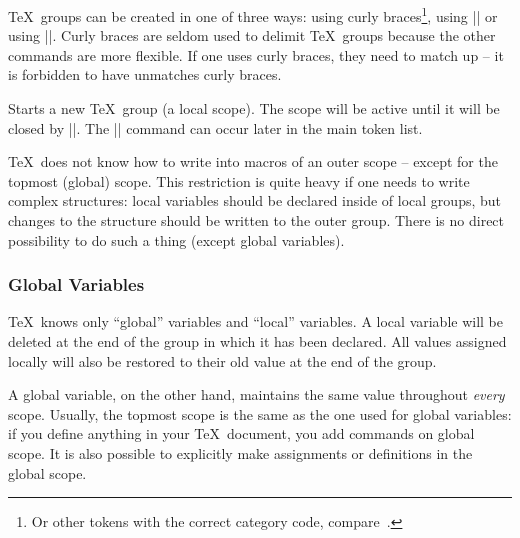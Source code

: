 \TeX\ groups can be created in one of three ways: using curly braces\footnote{Or other tokens with the correct category code, compare~\cite{texbook}.}, using |\begingroup| or using |\bgroup|. Curly braces are seldom used to delimit \TeX\ groups because the other commands are more flexible. If one uses curly braces, they need to match up -- it is forbidden to have unmatches curly braces.
\begin{command}{\begingroup}
	Starts a new \TeX\ group (a local scope). The scope will be active until it will be closed by |\endgroup|. The |\endgroup| command can occur later in the main token list.
\end{command}

\TeX\ does not know how to write into macros of an outer scope -- except for the topmost (global) scope. This restriction is quite heavy if one needs to write complex structures: local variables should be declared inside of local groups, but changes to the structure should be written to the outer group. There is no direct possibility to do such a thing (except global variables).

\subsubsection{Global Variables}
\TeX\ knows only ``global'' variables and ``local'' variables. A local variable will be deleted at the end of the group in which it has been declared. All values assigned locally will also be restored to their old value at the end of the group.

A global variable, on the other hand, maintains the same value throughout \emph{every} scope. Usually, the topmost scope is the same as the one used for global variables: if you define anything in your \TeX\ document, you add commands on global scope. It is also possible to explicitly make assignments or definitions in the global scope.

